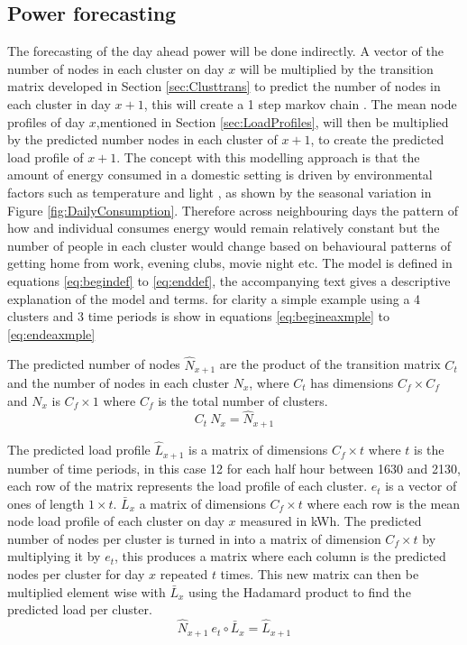 \subsection{Power forecasting}
The forecasting of the day ahead power will be done indirectly. A vector of the number of nodes in each cluster on day $x$ will be multiplied by the transition matrix developed in Section \ref{sec:Clusttrans} to predict the number of nodes in each cluster in day $x+1$, this will create a 1 step markov chain \cite{barber2012}. The mean node profiles of day $x$,mentioned in Section \ref{sec:LoadProfiles}, will then be multiplied by the predicted number nodes in each cluster of $x+1$, to create the predicted load profile of $x+1$. The concept with this modelling approach is that the amount of energy consumed in a domestic setting is driven by environmental factors such as temperature and light  \cite{hmgovernment2014} \cite{homesshowgreatestseasonalvariationinelectricityusetodayinenergyusenergyinformationadministrationeia2013}, as shown by the seasonal variation in Figure \ref{fig:DailyConsumption}. Therefore across neighbouring days the pattern of how and individual consumes energy would remain relatively constant but the number of people in each cluster would change based on behavioural patterns of getting home from work, evening clubs, movie night etc.
The model is defined in equations \ref{eq:begindef} to \ref{eq:enddef}, the accompanying text gives a descriptive explanation of the model and terms. for clarity a simple example using a 4 clusters and 3 time periods is show in equations \ref{eq:begineaxmple} to \ref{eq:endeaxmple}

The predicted number of nodes $\hat{N}_{x+1}$ are the product of the transition matrix $C_t$ and the number of nodes in each cluster $N_x$, where $C_t$ has dimensions $C_f \times C_f$ and $N_x$ is $C_f \times 1$ where $C_f$ is the total number of clusters.
\begin{equation}
C_t \:N_x=\hat{N}_{x+1}
\label{eq:begindef}
\end{equation}

The predicted load profile $\hat{L}_{x+1}$ is a matrix of dimensions $C_f\times t$ where $t$ is the number of time periods, in this case 12 for each half hour between 1630 and 2130, each row of the matrix represents the load profile of each cluster. $e_t$ is a vector of ones of length $1 \times t$. $\bar{L}_x$ a matrix of dimensions $C_f\times t$ where each row is the mean node load profile of each cluster on day $x$ measured in kWh. The predicted number of nodes per cluster is turned in into a matrix of dimension $C_f \times t$ by multiplying it by $e_t$, this produces a matrix where each column is the predicted nodes per cluster for day $x$ repeated $t$ times. This new matrix can then be multiplied element wise with $\bar{L}_x$ using the Hadamard product to find the predicted load per cluster.
\begin{equation}
\hat{N}_{x+1}\: e_t \circ \bar{L}_x=\hat{L}_{x+1}
\end{equation}

